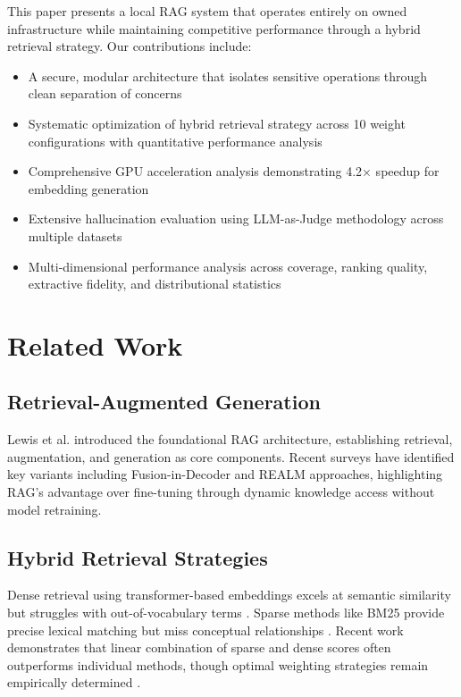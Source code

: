 \documentclass[11pt]{article}
\begin{document}
This paper presents a local RAG system that operates entirely on owned infrastructure while maintaining competitive performance through a hybrid retrieval strategy. Our contributions include:

\begin{itemize}
\item A secure, modular architecture that isolates sensitive operations through clean separation of concerns
\item Systematic optimization of hybrid retrieval strategy across 10 weight configurations with quantitative performance analysis
\item Comprehensive GPU acceleration analysis demonstrating 4.2× speedup for embedding generation
\item Extensive hallucination evaluation using LLM-as-Judge methodology across multiple datasets
\item Multi-dimensional performance analysis across coverage, ranking quality, extractive fidelity, and distributional statistics
\end{itemize}

\section{Related Work}

\subsection{Retrieval-Augmented Generation}
Lewis et al. \cite{lewis2020rag} introduced the foundational RAG architecture, establishing retrieval, augmentation, and generation as core components. Recent surveys \cite{arxiv24102} have identified key variants including Fusion-in-Decoder and REALM approaches, highlighting RAG's advantage over fine-tuning through dynamic knowledge access without model retraining.

\subsection{Hybrid Retrieval Strategies}
Dense retrieval using transformer-based embeddings excels at semantic similarity but struggles with out-of-vocabulary terms \cite{sentencetransformers,bgeembeddings}. Sparse methods like BM25 provide precise lexical matching but miss conceptual relationships \cite{hybridretrieval}. Recent work demonstrates that linear combination of sparse and dense scores often outperforms individual methods, though optimal weighting strategies remain empirically determined \cite{hybridretrieval}.
\end{document}
